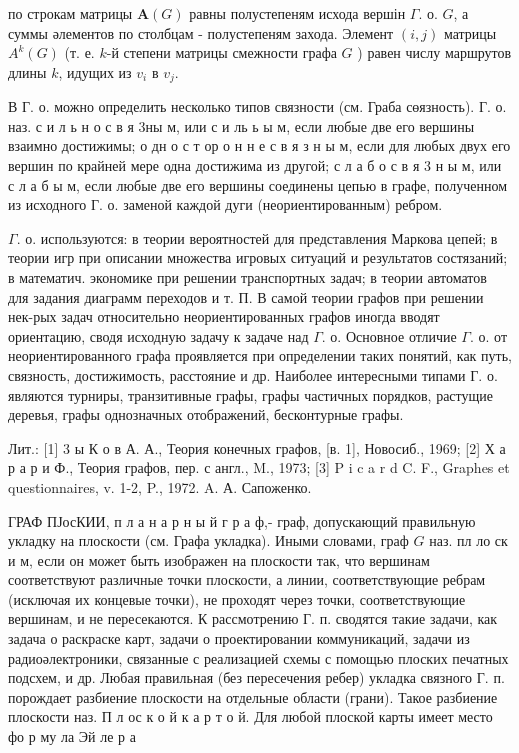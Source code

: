 \documentclass[10pt]{article}
\begin{document}
по строкам матрицы $\boldsymbol{A}(G)$ равны полустепеням исхода вершін $\Gamma$. о. $G$, а суммы әлементов по столбцам - полустепеням захода. Элемент $(i, j)$ матрицы $A^{k}(G)$ (т. е. $k$-й степени матрицы смежности графа $G$ ) равен числу маршрутов длины $k$, идущих из $v_{i}$ в $v_{j}$.



В Г. о. можно определить несколько типов связности (см. Граба сөязность). Г. о. наз. с и л ь н о с в я 3ны м, или с и ль ь ы м, если любые две его вершины взаимно достижимы; о дн о с т ор о н н е с в я з н ы м, если для любых двух его вершин по крайней мере одна достижима из другой; с л а б о с в я 3 н ы м, или с л а б ы м, если любые две его вершины соединены цепью в графе, полученном из исходного Г. о. заменой каждой дуги (неориентированным) ребром.



$\Gamma$. о. используются: в теории вероятностей для представления Маркова цепей; в теории игр при описании множества игровых ситуаций и результатов состязаний; в математич. экономике при решении транспортных задач; в теории автоматов для задания диаграмм переходов и т. П. В самой теории графов при решении нек-рых задач относительно неориентированных графов иногда вводят ориентацию, сводя исходную задачу к задаче над $\Gamma$. о. Основное отличие $\Gamma$. о. от неориентированного графа проявляется при определении таких понятий, как путь, связность, достижимость, расстояние и др. Наиболее интересными типами Г. о. являются турниры, транзитивные графы, графы частичных порядков, растущие деревья, графы однозначных отображений, бесконтурные графы.



Лит.: [1] 3 ы К о в А. А., Теория конечных графов, [в. 1], Новосиб., 1969; [2] Х а р а р и Ф., Теория графов, пер. с англ., M., 1973; [3] P i c a r d C. F., Graphes et questionnaires, v. 1-2, P., 1972. A. А. Сапоженко.



ГРАФ ПЈосКИИ, п л а н а р н ы й $г$ р а ф,- граф, допускающий правильную укладку на плоскости (см. Графа укладка). Иными словами, граф $G$ наз. пл ло ск и м, если он может быть изображен на плоскости так, что вершинам соответствуют различные точки плоскости, а линии, соответствующие ребрам (исключая их концевые точки), не проходят через точки, соответствующие вершинам, и не пересекаются. К рассмотрению Г. п. сводятся такие задачи, как задача о раскраске карт, задачи о проектировании коммуникаций, задачи из радиоәлектроники, связанные с реализацией схемы с помощью плоских печатных подсхем, и др. Любая правильная (без пересечения ребер) укладка связного Г. п. порождает разбиение плоскости на отдельные области (грани). Такое разбиение плоскости наз. П л ос к о й к а р т о й. Для любой плоской карты имеет место фо р му ла Эй ле р а
\end{document}
